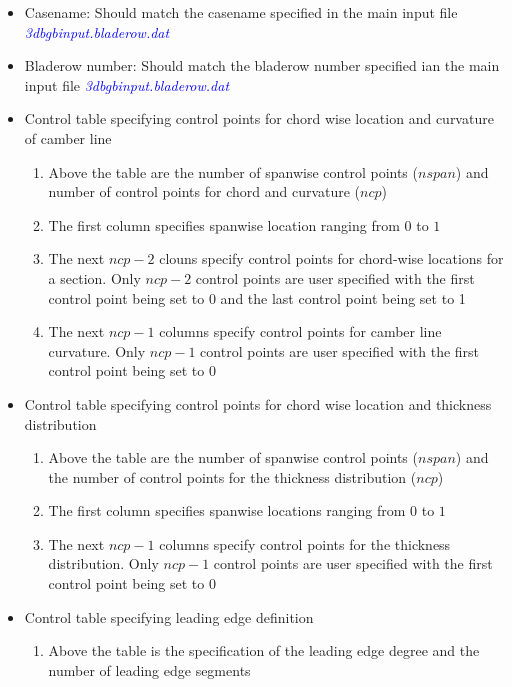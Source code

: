 \documentclass[8pt]{article}
\begin{document}
\noindent
\begin{itemize}[leftmargin=*]
    \item Casename: Should match the casename specified in the main input file \textit{\textcolor{blue}{3dbgbinput.bladerow.dat}}
    \item Bladerow number: Should match the bladerow number specified ian the main input file \textit{\textcolor{blue}{3dbgbinput.bladerow.dat}}
    \item Control table specifying control points for chord wise location and curvature of camber line
    \begin{enumerate}[label=\alph*]
        \item Above the table are the number of spanwise control points ($nspan$) and number of control points for chord and curvature ($ncp$)
        \item The first column specifies spanwise location ranging from $0$ to $1$
        \item The next $ncp - 2$ clouns specify control points for chord-wise locations for a section. Only $ncp - 2$ control points are user specified with the first control point being set to 0 and the last control point being set to 1
        \item The next $ncp - 1$ columns specify control points for camber line curvature. Only $ncp - 1$ control points are user specified with the first control point being set to 0 
    \end{enumerate}
    \item Control table specifying control points for chord wise location and thickness distribution
    \begin{enumerate}[label=\alph*]
        \item Above the table are the number of spanwise control points ($nspan$) and the number of control points for the thickness distribution ($ncp$)
        \item The first column specifies spanwise locations ranging from $0$ to $1$
        \item The next $ncp - 1$ columns specify control points for the thickness distribution. Only $ncp - 1$ control points are user specified with the first control point being set to 0
    \end{enumerate}
    \item Control table specifying leading edge definition
    \begin{enumerate}[label=\alph*]
        \item Above the table is the specification of the leading edge degree and the number of leading edge segments

\end{enumerate}
\end{itemize}
\end{document}
